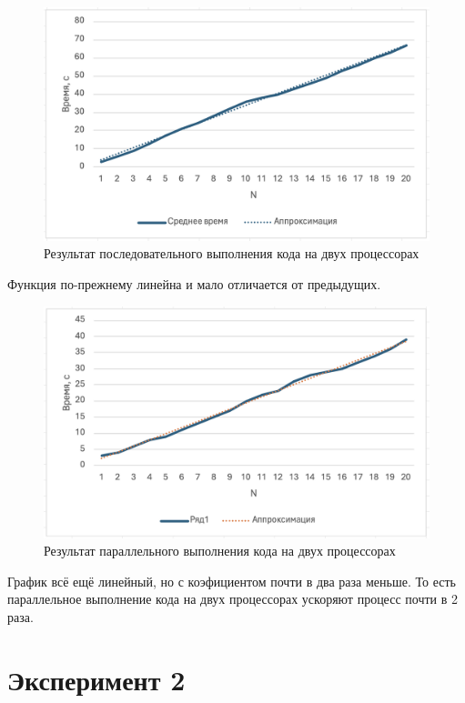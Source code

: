 \documentclass{article}
\begin{document}
\begin{figure}[H]
\centering
\includegraphics[width=1\textwidth]{images/9.png}
\caption{Результат последовательного выполнения кода на двух процессорах}
\end{figure}

Функция по-прежнему линейна и мало отличается от предыдущих.

\begin{figure}[H]
\centering
\includegraphics[width=1\textwidth]{images/10.png}
\caption{Результат параллельного выполнения кода на двух процессорах}
\end{figure}

График всё ещё линейный, но с коэфициентом почти в два раза меньше. То есть параллельное выполнение кода на двух процессорах ускоряют процесс почти в 2 раза.

\section*{Эксперимент 2}
\end{document}
